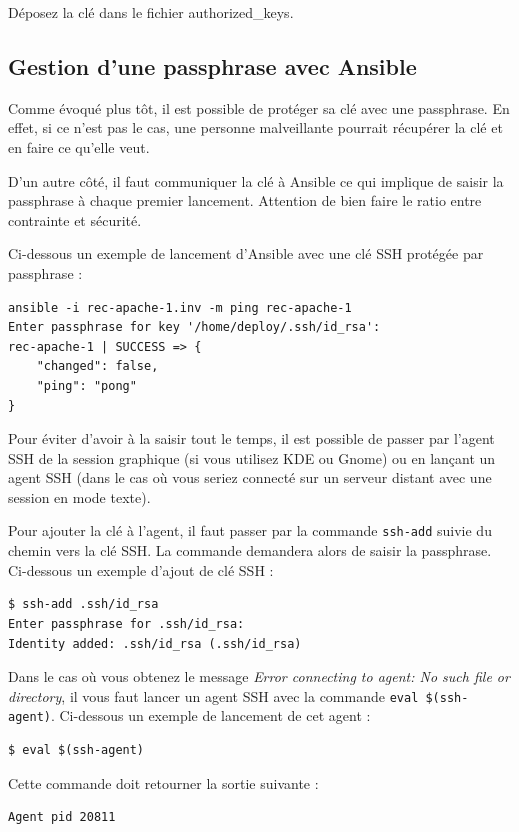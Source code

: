 \documentclass[hidelinks]{article}
\begin{document}
Déposez la clé dans le fichier authorized_keys.


\subsection{Gestion d'une passphrase avec Ansible}

Comme évoqué plus tôt, il est possible de protéger sa clé avec une passphrase. En effet, si ce n'est pas le cas, une personne malveillante pourrait récupérer la clé et en faire ce qu'elle veut.

D'un autre côté, il faut communiquer la clé à Ansible ce qui implique de saisir la passphrase à chaque premier lancement. Attention de bien faire le ratio entre contrainte et sécurité.

Ci-dessous un exemple de lancement d'Ansible avec une clé SSH protégée par passphrase :
\begin{verbatim}
ansible -i rec-apache-1.inv -m ping rec-apache-1  
Enter passphrase for key '/home/deploy/.ssh/id_rsa':   
rec-apache-1 | SUCCESS => {  
    "changed": false, 
    "ping": "pong" 
}
\end{verbatim}

Pour éviter d'avoir à la saisir tout le temps, il est possible de passer par l'agent SSH de la session graphique (si vous utilisez KDE ou Gnome) ou en lançant un agent SSH (dans le cas où vous seriez connecté sur un serveur distant avec une session en mode texte).

Pour ajouter la clé à l'agent, il faut passer par la commande \texttt{ssh-add} suivie du chemin vers la clé SSH. La commande demandera alors de saisir la passphrase. Ci-dessous un exemple d'ajout de clé SSH :

\begin{verbatim}
$ ssh-add .ssh/id_rsa
Enter passphrase for .ssh/id_rsa:  
Identity added: .ssh/id_rsa (.ssh/id_rsa)  
\end{verbatim}

Dans le cas où vous obtenez le message \textit{Error connecting to agent: No such file or directory}, il vous faut lancer un agent SSH avec la commande \texttt{eval \$(ssh-agent)}. Ci-dessous un exemple de lancement de cet agent :

\begin{verbatim}
$ eval $(ssh-agent)
\end{verbatim}

Cette commande doit retourner la sortie suivante :

\begin{verbatim}
Agent pid 20811
\end{verbatim}
\end{document}

